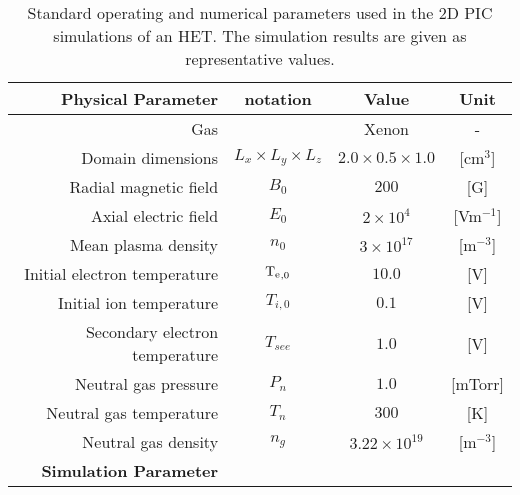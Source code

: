   \begin{table}[htbp] %
       \centering
       \caption{\label{parameters} Standard operating and numerical parameters used in the 2D PIC simulations of an HET.  The simulation results are given as representative values.}
       \begin{tabular}{@{}r c c c@{}} 
          \toprule
          {\bf Physical Parameter} & notation & Value & Unit \\
          \midrule
          Gas & & Xenon & - \\
          Domain dimensions & $L_{x} \times L_{y} \times L_{z}$ & $2.0 \times 0.5 \times 1.0$ & [cm$^3$] \\
          Radial magnetic field & $B_{0}$                    & $200$                 & [{G}] \\
          Axial electric field & $E_{0}$                    & $2 \times 10^{4}$     & [{Vm}$^{-1}$] \\
          Mean plasma density & $n_{0}$                    & $3 \times 10^{17}$    & [{m}$^{-3}$] \\
          Initial electron temperature & $\mathrm{T_e}_{,0}  $               & $10.0$                 & [{V}] \\
          Initial ion temperature & $T_{i,0}   $               & $0.1$                 & [{V}] \\
          Secondary electron temperature & $T_{see}   $               & $1.0$                 & [{V}] \\
          Neutral gas pressure & $P_{n}     $               & $1.0$                 & [{mTorr}] \\
          Neutral gas temperature & $T_{n}     $               & $300$                 & [{K}] \\
          Neutral gas density & $n_{g}     $               & $3.22 \times 10^{19}$ & [{m}$^{-3}$]\\
          \midrule
          {\bf Simulation Parameter} &  &   &  \\
          

\end{tabular}
\end{table}
